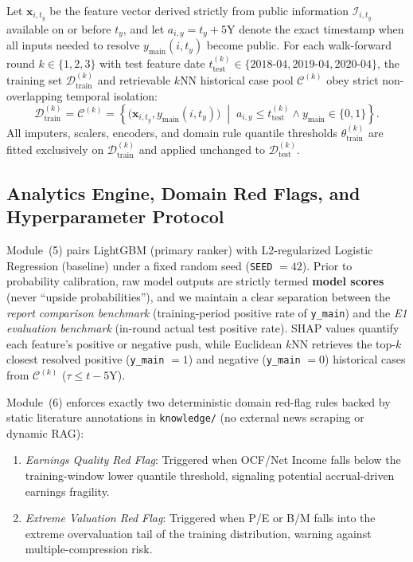 \documentclass[conference]{IEEEtran}
\begin{document}
Let $\mathbf{x}_{i,t_y}$ be the feature vector derived strictly from public information $\mathcal{I}_{i,t_y}$ available on or before $t_y$, and let $a_{i,y} = t_y + 5\text{Y}$ denote the exact timestamp when all inputs needed to resolve $y_{\text{main}}(i, t_y)$ become public. For each walk-forward round $k \in \{1, 2, 3\}$ with test feature date $t_{\text{test}}^{(k)} \in \{\text{2018-04}, \text{2019-04}, \text{2020-04}\}$, the training set $\mathcal{D}_{\text{train}}^{(k)}$ and retrievable $k$NN historical case pool $\mathcal{C}^{(k)}$ obey strict non-overlapping temporal isolation:
\begin{equation}
\label{eq:walkforward}
\mathcal{D}_{\text{train}}^{(k)} = \mathcal{C}^{(k)} = \left\{ \big(\mathbf{x}_{i,t_y}, y_{\text{main}}(i,t_y)\big) \;\middle|\; a_{i,y} \le t_{\text{test}}^{(k)} \wedge y_{\text{main}} \in \{0,1\} \right\}.
\end{equation}
All imputers, scalers, encoders, and domain rule quantile thresholds $\theta_{\text{train}}^{(k)}$ are fitted exclusively on $\mathcal{D}_{\text{train}}^{(k)}$ and applied unchanged to $\mathcal{D}_{\text{test}}^{(k)}$.

\subsection{Analytics Engine, Domain Red Flags, and Hyperparameter Protocol}
Module~(5) pairs LightGBM (primary ranker) with L2-regularized Logistic Regression (baseline) under a fixed random seed (\texttt{SEED} $= 42$). Prior to probability calibration, raw model outputs are strictly termed \textbf{model scores} (never ``upside probabilities''), and we maintain a clear separation between the \emph{report comparison benchmark} (training-period positive rate of \texttt{y\_main}) and the \emph{E1 evaluation benchmark} (in-round actual test positive rate). SHAP values quantify each feature's positive or negative push, while Euclidean $k$NN retrieves the top-$k$ closest resolved positive (\texttt{y\_main} $= 1$) and negative (\texttt{y\_main} $= 0$) historical cases from $\mathcal{C}^{(k)}$ ($\tau \le t - 5\text{Y}$).

Module~(6) enforces exactly two deterministic domain red-flag rules backed by static literature annotations in \texttt{knowledge/} (no external news scraping or dynamic RAG):
\begin{enumerate}
    \item \emph{Earnings Quality Red Flag}: Triggered when OCF/Net Income falls below the training-window lower quantile threshold, signaling potential accrual-driven earnings fragility.
    \item \emph{Extreme Valuation Red Flag}: Triggered when P/E or B/M falls into the extreme overvaluation tail of the training distribution, warning against multiple-compression risk.
\end{enumerate}
\end{document}
